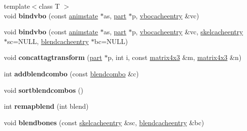 \begin{DoxyCompactItemize}
{\footnotesize template$<$class T $>$ }\\void {\bfseries bindvbo} (const \hyperlink{structanimmodel_1_1animstate}{animstate} $\ast$as, \hyperlink{structanimmodel_1_1part}{part} $\ast$p, \hyperlink{structskelmodel_1_1vbocacheentry}{vbocacheentry} \&vc)
\item 
\mbox{\label{structskelmodel_1_1skelmeshgroup_a021a19f8fa70d25fb372c6ffe37f8744}} 
void {\bfseries bindvbo} (const \hyperlink{structanimmodel_1_1animstate}{animstate} $\ast$as, \hyperlink{structanimmodel_1_1part}{part} $\ast$p, \hyperlink{structskelmodel_1_1vbocacheentry}{vbocacheentry} \&vc, \hyperlink{structskelmodel_1_1skelcacheentry}{skelcacheentry} $\ast$sc=N\+U\+LL, \hyperlink{structskelmodel_1_1blendcacheentry}{blendcacheentry} $\ast$bc=N\+U\+LL)
\item 
\mbox{\label{structskelmodel_1_1skelmeshgroup_a52b3c428fdc3f7e76b6bf2a4d4094925}} 
void {\bfseries concattagtransform} (\hyperlink{structanimmodel_1_1part}{part} $\ast$p, int i, const \hyperlink{structmatrix4x3}{matrix4x3} \&m, \hyperlink{structmatrix4x3}{matrix4x3} \&n)
\item 
\mbox{\label{structskelmodel_1_1skelmeshgroup_a207adf23d429e469c34350c212b2b1db}} 
int {\bfseries addblendcombo} (const \hyperlink{structskelmodel_1_1blendcombo}{blendcombo} \&c)
\item 
\mbox{\label{structskelmodel_1_1skelmeshgroup_a13e86e7aed669be2ecec990e9c16c76e}} 
void {\bfseries sortblendcombos} ()
\item 
\mbox{\label{structskelmodel_1_1skelmeshgroup_a9fb794d87ba074230e2385f8f1213e94}} 
int {\bfseries remapblend} (int blend)
\item 
\mbox{\label{structskelmodel_1_1skelmeshgroup_a8e6d91ffcc421c3e20c4a9b3665885d0}} 
void {\bfseries blendbones} (const \hyperlink{structskelmodel_1_1skelcacheentry}{skelcacheentry} \&sc, \hyperlink{structskelmodel_1_1blendcacheentry}{blendcacheentry} \&bc)
\item 
\mbox{\label{structskelmodel_1_1skelmeshgroup_a0f9f7e08f10ca0351098b554337722fb}} 

\end{DoxyCompactItemize}
